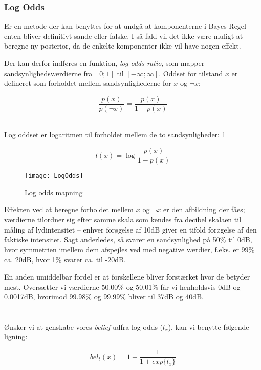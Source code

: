 \subsubsection{Log Odds}
Er en metode der kan benyttes for at undgå at komponenterne i Bayes Regel enten bliver definitivt sande eller falske.
I så fald vil det ikke være muligt at beregne ny posterior, da de enkelte komponenter ikke vil have nogen effekt.

Der kan derfor indføres en funktion, \textit{log odds ratio}, som mapper sandsynlighedsværdierne fra $[0;1]$ til $[-\infty;\infty]$.
Oddset for tilstand $x$ er defineret som forholdet mellem sandsynlighederne for $x$ og $\lnot x$: 

$$\frac{p(x)}{p(\lnot x)} = \frac{p(x)}{1 - p(x)}$$ 

\cite[s. 94]{probabilisticRobotics} \\

Log oddset er logaritmen til forholdet mellem de to sandsynligheder: \cref{logoddsimg}

$$l(x) = \log \frac{p(x)}{1 - p(x)}$$

\begin{figure}
\centering \texttt{[image: LogOdds]}
\label{logoddsimg}
\caption{Log odds mapning}
\end{figure}

Effekten ved at beregne forholdet mellem $x$ og $\neg x$ er den afbildning der fåes; værdierne tilordner sig efter samme skala som kendes fra decibel skalaen til måling af lydintensitet -- enhver forøgelse af 10dB giver en tifold forøgelse af den faktiske intensitet.
Sagt anderledes, så svarer en sandsynlighed på 50\% til 0dB, hvor symmetrien imellem dem afspejles ved med negative værdier, f.eks. er 99\% ca. 20dB, hvor 1\% svarer ca. til -20dB.

En anden umiddelbar fordel er at forskellene bliver forstærket hvor de betyder mest.
Oversætter vi værdierne 50.00\% og 50.01\% får vi henholdsvis 0dB og 0.0017dB, hvorimod 99.98\% og 99.99\% bliver til 37dB og 40dB. \\ \\
\cite[s. 2]{logodds} \\

Ønsker vi at genskabe vores \textit{belief} udfra log odds ($l_x$), kan vi benytte følgende ligning:

$$bel_t(x) = 1 - \frac{1}{1 + exp\{l_x\}}$$ \\
\cite[s. 95]{probabilisticRobotics} 

